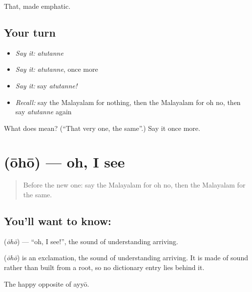 \begin{grammarlens}[title={What you've built}]
That, made emphatic.
\end{grammarlens}

\subsection*{Your turn}
\begin{itemize}
\raggedright
  \item \emph{Say it:} \emph{atutanne}
  \item \emph{Say it:} \emph{atutanne}, once more
  \item \emph{Say it:} say \emph{atutanne!}
  \item \emph{Recall:} say the Malayalam for nothing, then the Malayalam for oh no, then say \emph{atutanne} again
\end{itemize}

\begin{tcolorbox}[breakable,colback=teal!4,colframe=teal!35!black,title={Before you move on}]
What does  mean? (\textquotedblleft{}That very one, the same\textquotedblright{}.) Say it once more.
\end{tcolorbox}
\section[\texorpdfstring{\ml{ഓഹോ} (ōhō)}{ഓഹോ (ōhō)}]{ (ōhō) — oh, I see}

\label{lesson:ML-C122-ohisee}



\begin{quote}
Before the new one: say the Malayalam for oh no, then the Malayalam for the same.
\end{quote}

\subsection*{You'll want to know: }
\textbf{} (\emph{ōhō}) — \textquotedblleft{}oh, I see!\textquotedblright{}, the sound of understanding arriving.

\begin{cousinweb}
\textbf{} (\emph{ōhō}) is an exclamation, the sound of understanding arriving. It is made of sound rather than built from a root, so no dictionary entry lies behind it.
\end{cousinweb}

\begin{grammarlens}[title={What you've built}]
The happy opposite of ayyō.
\end{grammarlens}

